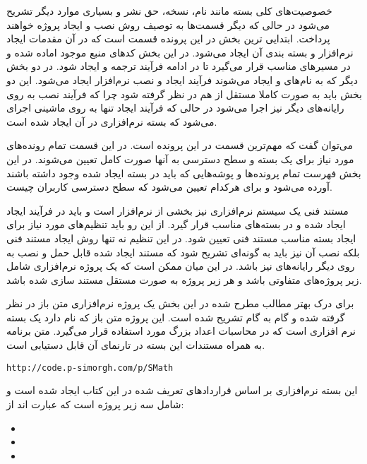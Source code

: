  خصوصیت‌های کلی بسته مانند نام، نسخه، حق نشر و بسیاری موارد دیگر
تشریح می‌شود در حالی که دیگر قسمت‌ها به توصیف روش نصب و ایجاد پروژه خواهند
پرداخت. ابتدایی ترین بخش در این پرونده قسمت  است که در آن مقدمات ایجاد
نرم‌افزار و بسته بندی آن ایجاد می‌شود. در این بخش کدهای منبع موجود اماده شده و
در مسیرهای مناسب قرار می‌گیرد تا در ادامه فرآیند ترجمه و ایجاد شود. در دو بخش
دیگر که به نام‌های  و  ایجاد می‌شوند فرآیند ایجاد و نصب
نرم‌افزار ایجاد می‌شود. این دو بخش باید به صورت کاملا مستقل از هم در نظر گرفته
شود چرا که فرآیند نصب به روی رایانه‌های دیگر نیز اجرا می‌شود در حالی که فرآیند
ایجاد تنها به روی ماشینی اجرای می‌شود که بسته نرم‌افزاری در آن ایجاد شده است.

می‌توان گفت که  مهم‌ترین قسمت در این پرونده است. در این قسمت تمام
رونده‌های مورد نیاز برای یک بسته و سطح دسترسی به آنها صورت کامل 
تعیین می‌شوند. در این بخش فهرست تمام پرونده‌ها و پوشه‌هایی که باید در بسته ایجاد
شده وجود داشته باشند آورده می‌شود و برای هرکدام تعیین می‌شود که سطح دسترسی
کاربران چیست.

مستند فنی یک سیستم نرم‌افزاری نیز بخشی از نرم‌افزار است و باید در فرآیند ایجاد
ایجاد شده و در بسته‌های مناسب قرار گیرد. از این رو باید تنظیم‌های مورد نیاز برای
ایجاد بسته مناسب مستند فنی تعیین شود. در این تنظیم نه تنها روش ایجاد مستند فنی
بلکه نصب آن نیز باید به گونه‌ای تشریح شود که مستند ایجاد شده قابل حمل و نصب به
روی دیگر رایانه‌های نیز باشد. در این میان ممکن است که یک پروژه نرم‌افزاری شامل
زیر پروژه‌های متفاوتی باشد و هر زیر پروژه به صورت مستقل مستند سازی شده باشد.

برای درک بهتر مطالب مطرح شده در این بخش یک پروژه نرم‌افزاری متن باز در نظر
گرفته شده و گام به گام تشریح شده است. این پروژه متن باز که  نام دارد
یک بسته نرم افزاری است که در محاسبات اعداد بزرگ مورد استفاده قرار
می‌گیرد\cite{smath}. متن برنامه به همراه مستندات این بسته در تارنمای آن قابل
دستیابی است.

\begin{latin}
\lstset{language=TeX}  
\begin{lstlisting}[frame=single] 
http://code.p-simorgh.com/p/SMath
\end{lstlisting}
\end{latin}

این بسته نرم‌افزاری بر اساس قراردادهای تعریف شده در این کتاب ایجاد شده است و
شامل سه زیر پروژه است که عبارت اند از:

\begin{itemize}
  \item {}
  \item {}
  \item {}
\end{itemize}

